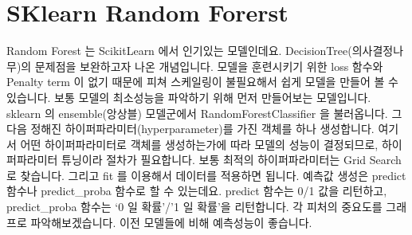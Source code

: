 \documentclass[letterpaper,10pt,english]{jupyterBook}
\begin{document}
\part{SK\sphinxhyphen{}learn \sphinxhyphen{} Random Forerst}
\label{\detokenize{chapter5/5.2.2_Modeling_Library:sk-learn-random-forerst}}
\sphinxAtStartPar
Random Forest 는 Scikit\sphinxhyphen{}Learn 에서 인기있는 모델인데요. Decision\sphinxhyphen{}Tree(의사결정나무)의 문제점을 보완하고자 나온 개념입니다. 모델을 훈련시키기 위한 loss 함수와 Penalty term 이 없기 때문에 피쳐 스케일링이 불필요해서 쉽게 모델을 만들어 볼 수 있습니다. 보통 모델의 최소성능을 파악하기 위해 먼저 만들어보는 모델입니다.
sklearn 의 ensemble(앙상블) 모델군에서 RandomForestClassifier 을 불러옵니다. 그 다음 정해진 하이퍼파라미터(hyperparameter)를 가진 객체를 하나 생성합니다. 여기서 어떤 하이퍼파라미터로 객체를 생성하는가에 따라 모델의 성능이 결정되므로, 하이퍼파라미터 튜닝이라 절차가 필요합니다. 보통 최적의 하이퍼파라미터는 Grid Search 로 찾습니다. 그리고 fit 를 이용해서 데이터를 적용하면 됩니다. 예측값 생성은 predict 함수나 predict\_proba 함수로 할 수 있는데요. predict 함수는 0/1 값을 리턴하고, predict\_proba 함수는 ‘0 일 확률’/’1 일 확률’을 리턴합니다. 각 피처의 중요도를 그래프로 파악해보겠습니다. 이전 모델들에 비해 예측성능이 좋습니다.
\end{document}
